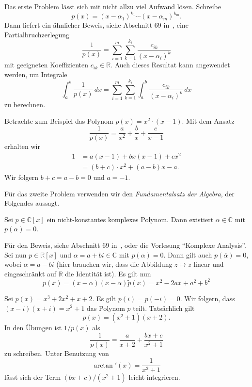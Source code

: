 \documentclass[../main.tex]{subfiles}
\begin{document}
Das erste Problem lässt sich mit nicht allzu viel Aufwand lösen.
Schreibe
\[
  p(x) = {(x - \alpha_1)}^{k_1} \cdots
  {(x - \alpha_m)}^{k_m}.
\]
Dann liefert ein ähnlicher Beweis,
siehe Abschnitt 69 in~\cite{heuser},
eine Partialbruchzerlegung
\[
  \frac{1}{p(x)} = \sum_{i=1}^{m} \sum_{k=1}^{k_i}
  \frac{c_{ik}}{{(x - \alpha_i)}^k}
\]
mit geeigneten Koeffizienten $c_{ik} \in \mathbb{R}$.
Auch dieses Resultat kann angewendet werden,
um Integrale
\[
  \int_{a}^{b} \frac{1}{p(x)} \, dx
  = \sum_{i=1}^{m} \sum_{k=1}^{k_i} \int_{a}^{b}
  \frac{c_{ik}}{{(x - \alpha_i)}^k}\, dx
\]
zu berechnen.

\begin{example}
  Betrachte zum Beispiel das Polynom
    $p(x) = x^2 \cdot (x - 1)$.
  Mit dem Ansatz
  \[
    \frac{1}{p(x)} = \frac{a}{x^2} + \frac{b}{x}
    + \frac{c}{x-1}
  \]
  erhalten wir
  \begin{align*}
    1 &
    = a(x - 1) + b x (x - 1) + cx^2\\
      &= (b + c) \cdot x^2 + (a - b) x - a.
  \end{align*}
  Wir folgern $b + c = a - b = 0$ und $a = -1$.
\end{example}

Für das zweite Problem verwenden wir den
\emph{Fundamentalsatz der Algebra},
der Folgendes aussagt.

\begin{lemma}
  Sei $p \in \mathbb{C}[x]$ ein nicht-konstantes
  komplexes Polynom. Dann existiert $\alpha \in \mathbb{C}$
  mit $p( \alpha ) = 0$.
\end{lemma}

Für den Beweis, siehe Abschnitt 69 in~\cite{heuser}, oder
die Vorlesung ``Komplexe Analysis''.
Sei nun $p \in \mathbb{R}[x]$ und $\alpha = a + bi \in \mathbb{C}$
mit $p ( \alpha ) = 0$.
Dann gilt auch
$p(\overline \alpha) = 0$,
wobei $\overline \alpha = a - bi$
(hier brauchen wir, dass die Abbildung
$z \mapsto \overline z$ linear
und eingeschränkt auf $\mathbb{R}$ die Identität ist).
Es gilt nun
\[
  p(x) = (x - \alpha)(x - \overline \alpha) \widetilde{p}(x)
  = x^2 - 2ax + a^2 + b^2
\]

\begin{example}
  Sei $p(x) = x^3 + 2x^2 + x + 2$.
  Es gilt $p(i) = p(-i) = 0$.
  Wir folgern, dass $(x- i)(x + i) = x^2 + 1$
  das Polynom $p$ teilt. Tatsächlich gilt
  \[
    p(x) = (x^2 + 1)(x+2).
  \]
  In den Übungen ist $1/p(x)$ als
  \[
    \frac{1}{p(x)} = \frac{a}{x + 2}
    + \frac{bx + c}{x^2 + 1}
  \]
  zu schreiben. Unter Benutzung von
  \[
    \arctan'(x) = \frac{1}{x^2 + 1}
  \]
  lässt sich der Term $(bx + c)/(x^2 + 1)$ leicht integrieren.
\end{example}
\end{document}
